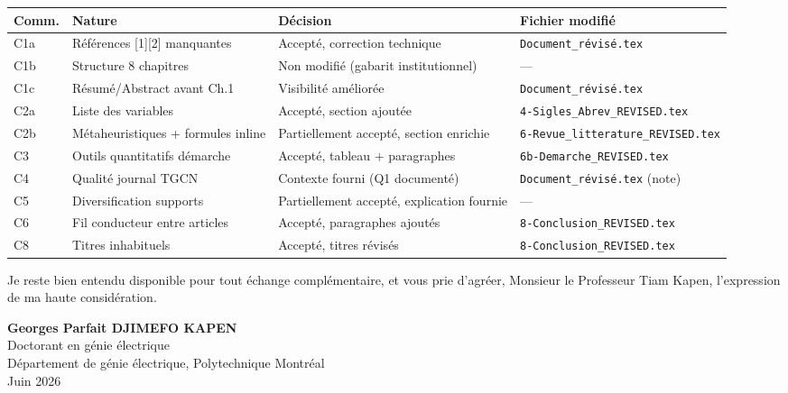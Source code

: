 \documentclass[12pt,a4paper]{article}
\begin{document}
\begin{center}
\small
\begin{tabular}{p{1.5cm} p{4.5cm} p{3cm} p{4cm}}
\toprule
\textbf{Comm.} & \textbf{Nature} & \textbf{Décision} & \textbf{Fichier modifié} \\
\midrule
C1a & Références [1][2] manquantes & Accepté, correction technique & \texttt{Document\_révisé.tex} \\
C1b & Structure 8 chapitres & Non modifié (gabarit institutionnel) & --- \\
C1c & Résumé/Abstract avant Ch.1 & Visibilité améliorée & \texttt{Document\_révisé.tex} \\
C2a & Liste des variables & Accepté, section ajoutée & \texttt{4-Sigles\_Abrev\_REVISED.tex} \\
C2b & Métaheuristiques + formules inline & Partiellement accepté, section enrichie & \texttt{6-Revue\_litterature\_REVISED.tex} \\
C3  & Outils quantitatifs démarche & Accepté, tableau + paragraphes & \texttt{6b-Demarche\_REVISED.tex} \\
C4  & Qualité journal TGCN & Contexte fourni (Q1 documenté) & \texttt{Document\_révisé.tex} (note) \\
C5  & Diversification supports & Partiellement accepté, explication fournie & --- \\
C6  & Fil conducteur entre articles & Accepté, paragraphes ajoutés & \texttt{8-Conclusion\_REVISED.tex} \\
C8  & Titres inhabituels & Accepté, titres révisés & \texttt{8-Conclusion\_REVISED.tex} \\
\bottomrule
\end{tabular}
\end{center}

\bigskip

Je reste bien entendu disponible pour tout échange complémentaire, et vous prie d'agréer, Monsieur le Professeur Tiam Kapen, l'expression de ma haute considération.

\bigskip
\begin{flushright}
\textbf{Georges Parfait DJIMEFO KAPEN}\\
Doctorant en génie électrique\\
Département de génie électrique, Polytechnique Montréal\\
Juin 2026
\end{flushright}
\end{document}
